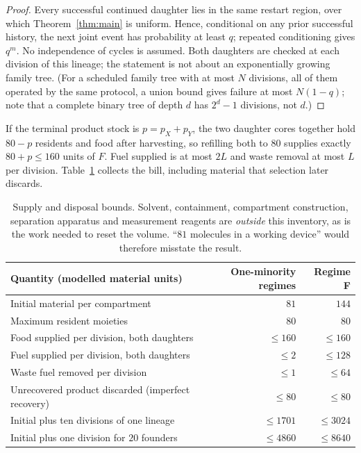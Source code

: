 \documentclass[11pt,a4paper]{article}
\theoremstyle{plain}
\theoremstyle{definition}
\theoremstyle{remark}
\begin{document}
\begin{proof}
Every successful continued daughter lies in the same restart region, over which
Theorem~\ref{thm:main} is uniform. Hence, conditional on any prior successful history, the
next joint event has probability at least $q$; repeated conditioning gives $q^m$. No
independence of cycles is assumed. Both daughters are checked at each division of this
lineage; the statement is not about an exponentially growing family tree. (For a
scheduled family tree with at most $N$ divisions, all of them operated by the same
protocol, a union bound gives failure at most $N(1-q)$; note that a complete binary tree
of depth $d$ has $2^{d}-1$ divisions, not $d$.)
\end{proof}

If the terminal product stock is $p=p_X+p_Y$, the two daughter cores together hold
$80-p$ residents and food after harvesting, so refilling both to $80$ supplies exactly
$80+p\le160$ units of $F$. Fuel supplied is at most $2L$ and waste removal at most $L$
per division. Table~\ref{tab:resources} collects the bill, including material that
selection later discards.

\begin{table}[htbp]\centering\small
\begin{tabular}{@{}lrr@{}}\toprule
Quantity (modelled material units) & One-minority regimes & Regime F\\\midrule
Initial material per compartment & $81$ & $144$\\
Maximum resident moieties & $80$ & $80$\\
Food supplied per division, both daughters & $\le160$ & $\le160$\\
Fuel supplied per division, both daughters & $\le2$ & $\le128$\\
Waste fuel removed per division & $\le1$ & $\le64$\\
Unrecovered product discarded (imperfect recovery) & $\le80$ & $\le80$\\
Initial plus ten divisions of one lineage & $\le1701$ & $\le3024$\\
Initial plus one division for $20$ founders & $\le4860$ & $\le8640$\\\bottomrule
\end{tabular}
\caption{Supply and disposal bounds. Solvent, containment, compartment construction,
separation apparatus and measurement reagents are \emph{outside} this inventory, as is
the work needed to reset the volume. ``$81$ molecules in a working device'' would
therefore misstate the result.}\label{tab:resources}
\end{table}
\end{document}
